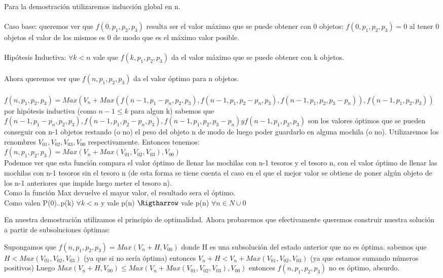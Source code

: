 \documentclass[spanish,12pt]{article}
\begin{document}
{Para la demostración utilizaremos inducción global en n.
\\
\\
Caso base: queremos ver que $f(0,p_{1},p_{2},p_{3})$ resulta ser el valor máximo que se puede obtener con 0 objetos:
$f(0,p_{1},p_{2},p_{3}) = 0$ al tener 0 objetos el valor de los mismos es 0 de modo que es el máximo valor posible.
\\
\\
Hipótesis Inductiva: $\forall k<n$ vale que $f(k,p_{1},p_{2},p_{3})$ da el valor máximo que se puede obtener con k objetos.
\\
\\
Ahora queremos ver que $f(n,p_{1},p_{2},p_{3})$ da el valor óptimo para n objetos.
\\
\\
$f(n,p_{1},p_{2},p_{3}) = Max(V_{n}+Max(f(n-1,p_{1}-p_{n},p_{2},p_{3}), f(n-1,p_{1},p_{2}-p_{n},p_{3}), f(n-1,p_{1},p_{2},p_{3}-p_{n})),f(n-1,p_{1},p_{2},p_{3})) $ \\
por hipótesis inductiva (como $n-1 \leq k$ para algun k) sabemos que $f(n-1,p_{1}-p_{n},p_{2},p_{3}), f(n-1,p_{1},p_{2}-p_{n},p_{3}), f(n-1,p_{1},p_{2},p_{3}-p_{n}) y f(n-1,p_{1},p_{2},p_{3})$ son los valores óptimos que se pueden conseguir con n-1 objetos restando (o no) el peso del objeto n de modo de luego poder guardarlo en alguna mochila (o no). Utilizaremos los renombres $V_{01},V_{02},V_{03},V_{00}$ respectivamente.
Entonces tenemos: \\
$f(n,p_{1},p_{2},p_{3})= Max(V_{n}+Max(V_{01},V_{02},V_{03}),V_{00})$\\
Podemos ver que esta función  compara el valor óptimo de llenar las mochilas con n-1 tesoros y el tesoro n, con el valor óptimo de llenar las mochilas con n-1 tesoros sin el tesoro n (de esta forma se tiene cuenta el caso en el que el mejor valor se obtiene de poner algún objeto  de los n-1 anteriores que impide luego meter el tesoro n).\\
Como la función Max devuelve el mayor valor, el resultado sera el óptimo.
\\
Como valen P(0)..p(k) $\forall k<n$ y vale p(n) $\Rigtharrow$ vale p(n) $\forall n \in N \cup {0} $

En nuestra demostración utilizamos el principio de optimalidad. Ahora probaremos que efectivamente queremos construir nuestra solución a partir de subsoluciones óptimas:

Supongamos que $f(n,p_{1},p_{2},p_{3}) = Max(V_{n} + H, V_{00})$ donde H es una subsolución del estado anterior que no es óptima. sabemos que $ H < Max(V_{01},V_{02},V_{03})$ (ya que si no sería óptima) entonces $V_{n}+H < V_{n}+Max(V_{01},V_{02},V_{03})$ (ya que estamos sumando números positivos) Luego $Max(V_{n}+H,V_{00}) \leq Max(V_{n}+Max(V_{01},V_{02},V_{03}), V_{00})$ entonces $f(n,p_{1},p_{2},p_{3})$ no es óptimo, absurdo. 



}
\end{document}
